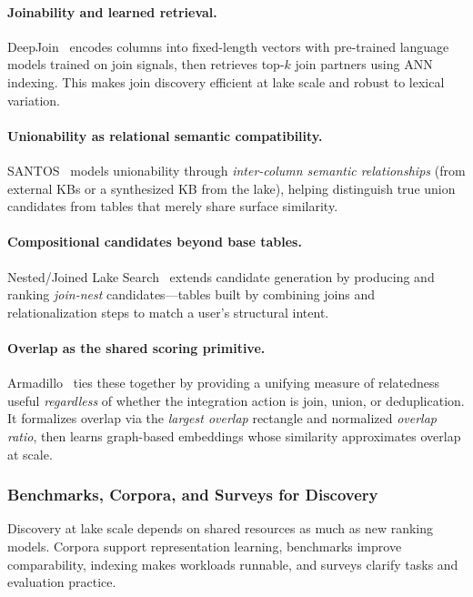 \documentclass[sigconf,nonacm]{acmart}
\begin{document}
\paragraph{Joinability and learned retrieval.}
DeepJoin~\cite{10.14778/3603581.3603587} encodes columns into fixed-length vectors with pre-trained language models trained on join signals, then retrieves top-$k$ join partners using ANN indexing. This makes join discovery efficient at lake scale and robust to lexical variation.

\paragraph{Unionability as relational semantic compatibility.}
SANTOS~\cite{10.1145/3588689} models unionability through \emph{inter-column semantic relationships} (from external KBs or a synthesized KB from the lake), helping distinguish true union candidates from tables that merely share surface similarity.

\paragraph{Compositional candidates beyond base tables.}
Nested/Joined Lake Search~\cite{10.14778/3681954.3682005} extends candidate generation by producing and ranking \emph{join-nest} candidates---tables built by combining joins and relationalization steps to match a user's structural intent.

\paragraph{Overlap as the shared scoring primitive.}
Armadillo~\cite{10.1145/3725365} ties these together by providing a unifying measure of relatedness useful \emph{regardless} of whether the integration action is join, union, or deduplication. It formalizes overlap via the \emph{largest overlap} rectangle and normalized \emph{overlap ratio}, then learns graph-based embeddings whose similarity approximates overlap at scale.

\subsubsection{Benchmarks, Corpora, and Surveys for Discovery}
Discovery at lake scale depends on shared resources as much as new ranking models. Corpora support representation learning, benchmarks improve comparability, indexing makes workloads runnable, and surveys clarify tasks and evaluation practice.
\end{document}
